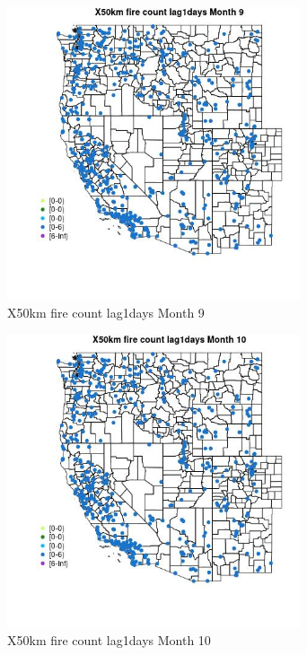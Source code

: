 \begin{figure} 
\centering  
\includegraphics[width=0.77\textwidth]{Code_Outputs/Report_ML_input_PM25_Step4_part_e_de_duplicated_aves_compiled_2019-05-14wNAs_MapObsMo9X50km_fire_count_lag1days.jpg} 
\caption{\label{fig:Report_ML_input_PM25_Step4_part_e_de_duplicated_aves_compiled_2019-05-14wNAsMapObsMo9X50km_fire_count_lag1days}X50km fire count lag1days Month 9} 
\end{figure} 
 

\begin{figure} 
\centering  
\includegraphics[width=0.77\textwidth]{Code_Outputs/Report_ML_input_PM25_Step4_part_e_de_duplicated_aves_compiled_2019-05-14wNAs_MapObsMo10X50km_fire_count_lag1days.jpg} 
\caption{\label{fig:Report_ML_input_PM25_Step4_part_e_de_duplicated_aves_compiled_2019-05-14wNAsMapObsMo10X50km_fire_count_lag1days}X50km fire count lag1days Month 10} 
\end{figure} 
 

